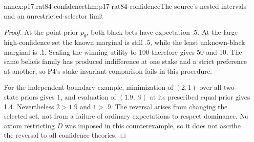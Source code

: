 \begin{annexitem}{annex:p17.rat84-confidence}{thm:p17-rat84-confidence}{The source's nested intervals and an unrestricted-selector limit}
\begin{proof}
At the point prior \(p_0\), both black bets have expectation
\(.5\). At the large high-confidence set the known marginal
is still \(.5\), while the least unknown-black marginal
is \(.1\). Scaling the winning utility to 100 therefore
gives 50 and 10. The same beliefs family has produced
indifference at one stake and a strict preference at another,
so P4's stake-invariant comparison fails in this procedure.

For the independent boundary example, minimization of
\((2,1)\) over all two-state priors gives 1, and evaluation
of \((1.9,.9)\) at its prescribed equal prior gives 1.4.
Nevertheless \(2>1.9\) and \(1>.9\). The reversal arises
from changing the selected set, not from a failure of
ordinary expectations to respect dominance. No axiom
restricting \(D\) was imposed in this counterexample,
so it does not ascribe the reversal to all confidence theories.
\end{proof}
\end{annexitem}

